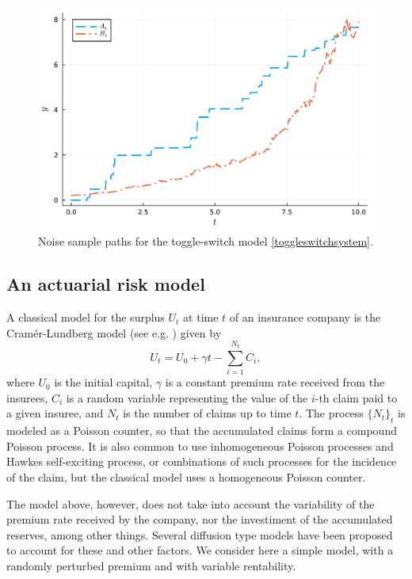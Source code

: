\documentclass[reqno,12pt]{amsart}
\theoremstyle{plain} %
\theoremstyle{definition} %
\begin{document}
\begin{figure}[htb]
    \includegraphics[scale=0.6]{img/noises_toggleswitch.pdf}
    \caption{Noise sample paths for the toggle-switch model \eqref{toggleswitchsystem}.}
    \label{figtoggleswitchnoise}
\end{figure}

\subsection{An actuarial risk model}

A classical model for the surplus $U_t$ at time $t$ of an insurance company is the Cram\'er-Lundberg model (see e.g. \cite{GerberShiu1998}) given by
\[
  U_t = U_0 + \gamma t - \sum_{i=1}^{N_t} C_i,
\]
where $U_0$ is the initial capital, $\gamma$ is a constant premium rate received from the insurees, $C_i$ is a random variable representing the value of the $i$-th claim paid to a given insuree, and $N_t$ is the number of claims up to time $t$. The process $\{N_t\}_t$ is modeled as a Poisson counter, so that the accumulated claims form a compound Poisson process. It is also common to use inhomogeneous Poisson processes and Hawkes self-exciting process, or combinations of such processes for the incidence of the claim, but the classical model uses a homogeneous Poisson counter.

The model above, however, does not take into account the variability of the premium rate received by the company, nor the investiment of the accumulated reserves, among other things. Several diffusion type models have been proposed to account for these and other factors. We consider here a simple model, with a randomly perturbed premium and with variable rentability.
\end{document}
